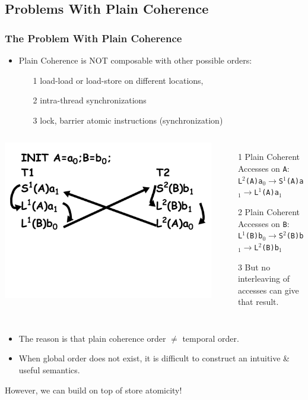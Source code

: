 \documentclass{beamer}
\renewcommand{\emph}[1]{\textcolor{structure}{#1}}
\begin{document}
\subsection{Problems With Plain Coherence}

\begin{frame}[fragile,t]
\frametitle{The Problem With Plain Coherence}

\begin{itemize}
    \item Plain Coherence is NOT composable  with other possible orders: 
    \begin{itemize}
        \item[1] load-load or load-store on different locations,
        \item[2] intra-thread synchronizations
        \item[3] lock, barrier atomic instructions (synchronization)\medskip
    \end{itemize}
\end{itemize}


\begin{columns}
\includegraphics[width=38ex]{Ch7Figs/ProblemPlainCoh}
\vspace{-7ex}
\begin{itemize}
    \item[1] Plain Coherent Accesses on {\tt A}:\\
                {\tt L$^2$(A)a$_0\rightarrow$S$^1$(A)a$_1\rightarrow$L$^1$(A)a$_1$}
    \item[2] Plain Coherent Accesses on {\tt B}:\\
                {\tt L$^1$(B)b$_0\rightarrow$S$^2$(B)b$_1\rightarrow$L$^2$(B)b$_1$}
    \item[3] \alert{But no interleaving of accesses can give that result}. 
\end{itemize}
\end{columns}
\vspace{-7ex}

\begin{itemize}
    \item The reason is that plain coherence order $\neq$ temporal order.
    \item When global order does not exist, it is difficult to construct
            an intuitive \& useful semantics.\medskip
\end{itemize}

\emph{However, we can build on top of store atomicity!}

\end{frame}
\end{document}
